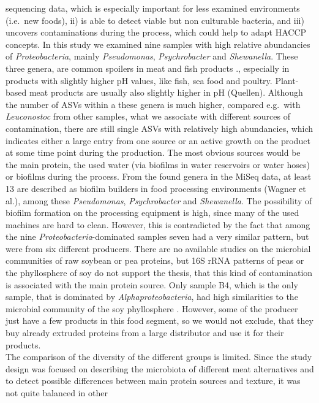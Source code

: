 \documentclass[preprint, 3p,
authoryear]{elsarticle} %
\begin{document}
sequencing data, which is especially important for less examined
environments (i.e.~new foods), ii) is able to detect viable but non
culturable bacteria, and iii) uncovers contaminations during the
process, which could help to adapt HACCP concepts. In this study we
examined nine samples with high relative abundancies of
\emph{Proteobacteria}, mainly \emph{Pseudomonas}, \emph{Psychrobacter}
and \emph{Shewanella}. These three genera, are common spoilers in meat
and fish products \citep{Odeyemi.2018}., especially in products with
slightly higher pH values, like fish, sea food and poultry. Plant-based
meat products are usually also slightly higher in pH (Quellen). Although
the number of ASVs within a these genera is much higher, compared
e.g.~with \emph{Leuconostoc} from other samples, what we associate with
different sources of contamination, there are still single ASVs with
relatively high abundancies, which indicates either a large entry from
one source or an active growth on the product at some time point during
the production. The most obvious sources would be the main protein, the
used water (via biofilms in water reservoirs or water hoses) or biofilms
during the process. From the found genera in the MiSeq data, at least 13
are described as biofilm builders in food processing environments
(Wagner et al.), among these \emph{Pseudomonas}, \emph{Psychrobacter}
and \emph{Shewanella}. The possibility of biofilm formation on the
processing equipment is high, since many of the used machines are hard
to clean. However, this is contradicted by the fact that among the nine
\emph{Proteobacteria}-dominated samples seven had a very similar
pattern, but were from six different producers. There are no available
studies on the microbial communities of raw soybean or pea proteins, but
16S rRNA patterns of peas or the phyllosphere of soy do not support the
thesis, that this kind of contamination is associated with the main
protein source. Only sample B4, which is the only sample, that is
dominated by \emph{Alphaproteobacteria}, had high similarities to the
microbial community of the soy phyllosphere \citep{Vorholt.2012}.
However, some of the producer just have a few products in this food
segment, so we would not exclude, that they buy already extruded
proteins from a large distributor and use it for their products.\\
The comparison of the diversity of the different groups is limited.
Since the study design was focused on describing the microbiota of
different meat alternatives and to detect possible differences between
main protein sources and texture, it was not quite balanced in other
\end{document}
